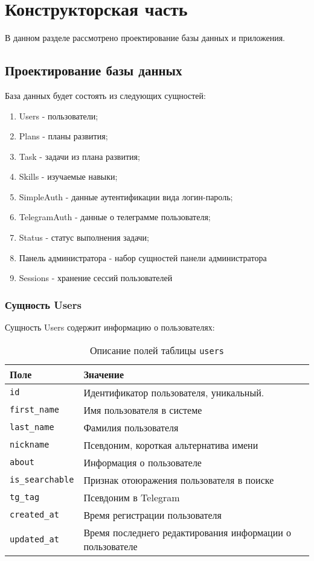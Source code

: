 \chapter{Конструкторская часть}
В данном разделе рассмотрено проектирование базы данных и приложения.

\section{Проектирование базы данных}
База данных будет состоять из следующих сущностей:
\begin{enumerate}
\item Users - пользователи;
\item Plans - планы развития;
\item Task - задачи из плана развития;
\item Skills - изучаемые навыки;
\item SimpleAuth - данные аутентификации вида логин-пароль;
\item TelegramAuth - данные о телеграмме пользователя;
\item Status - статус выполнения задачи;
\item Панель администратора - набор сущностей панели администратора
\item Sessions - хранение сессий пользователей
\end{enumerate}

\newpage
\subsection{Сущность Users}
Сущность Users содержит информацию о пользователях:
\begin{table}[!ht]
    \caption{Описание полей таблицы \texttt{users}}
    \label{tbl:users}
    \begin{center}
        \begin{tabular}{|p{}p{}|}
            \hline
            \textbf{Поле} & \textbf{Значение} \\\hline
            \texttt{id} & Идентификатор пользователя, уникальный. \\\hline
            \texttt{first\_name} & Имя пользователя в системе\\\hline
            \texttt{last\_name} & Фамилия пользователя \\\hline
            \texttt{nickname} & Псевдоним, короткая альтернатива имени \\\hline
            \texttt{about} & Информация о пользователе \\\hline
            \texttt{is\_searchable} & Признак отоюражения пользователя в поиске \\\hline
            \texttt{tg\_tag} & Псевдоним в Telegram \\\hline
            \texttt{created\_at} & Время регистрации пользователя\\\hline
            \texttt{updated\_at} & Время последнего редактирования информации о пользователе \\\hline
        \end{tabular}
    \end{center}
\end{table}
